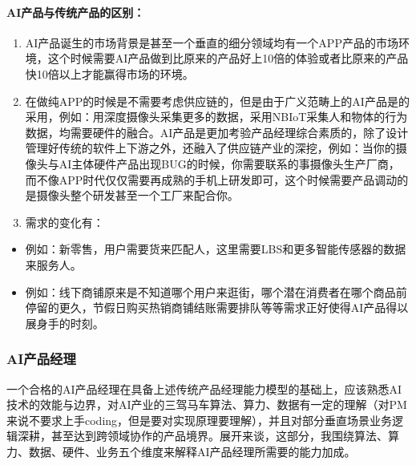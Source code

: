 \documentclass[letterpaper,11pt,english]{sphinxmanual}
\begin{document}
\paragraph{AI产品与传统产品的区别：}
\label{\detokenize{chapter_introduction/AI:id10}}\begin{enumerate}
%
\item {} 
AI产品诞生的市场背景是甚至一个垂直的细分领域均有一个APP产品的市场环境，这个时候需要AI产品做到比原来的产品好上10倍的体验或者比原来的产品快10倍以上才能赢得市场的环境。

\item {} 
在做纯APP的时候是不需要考虑供应链的，但是由于广义范畴上的AI产品是的采用，例如：用深度摄像头采集更多的数据，采用NB\sphinxhyphen{}IoT采集人和物体的行为数据，均需要硬件的融合。AI产品是更加考验产品经理综合素质的，除了设计管理好传统的软件上下游之外，还融入了供应链产业的深挖，例如：当你的摄像头与AI主体硬件产品出现BUG的时候，你需要联系的事摄像头生产厂商，而不像APP时代仅仅需要再成熟的手机上研发即可，这个时候需要产品调动的是摄像头整个研发甚至一个工厂来配合你。

\item {} 
需求的变化有：

\end{enumerate}
\begin{itemize}
\item {} 
例如：新零售，用户需要货来匹配人，这里需要LBS和更多智能传感器的数据来服务人。

\item {} 
例如：线下商铺原来是不知道哪个用户来逛街，哪个潜在消费者在哪个商品前停留的更久，节假日购买热销商铺结账需要排队等等需求正好使得AI产品得以展身手的时刻。

\end{itemize}


\subsubsection{AI产品经理}
\label{\detokenize{chapter_introduction/AI_PM:ai}}\label{\detokenize{chapter_introduction/AI_PM::doc}}
一个合格的AI产品经理在具备上述传统产品经理能力模型的基础上，应该熟悉AI技术的效能与边界，对AI产业的三驾马车算法、算力、数据有一定的理解（对PM来说不要求上手coding，但是要对实现原理要理解），并且对部分垂直场景业务逻辑深耕，甚至达到跨领域协作的产品境界。展开来谈，这部分，我围绕算法、算力、数据、硬件、业务五个维度来解释AI产品经理所需要的能力加成。%
\begin{footnote}[73]\sphinxAtStartFootnote
{}
%
\end{footnote}
\end{document}
